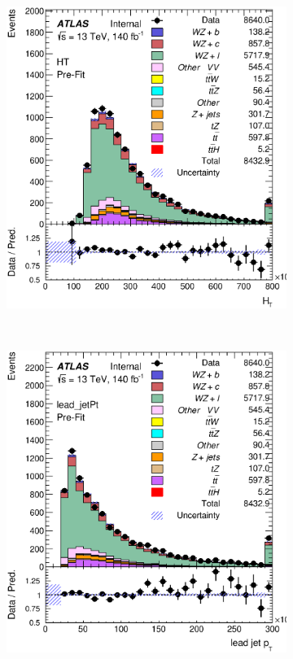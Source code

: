 \documentclass[NOTE, atlasdraft=true, texlive=2016, UKenglish]{\ATLASLATEXPATH atlasdoc}
\begin{document}
\begin{figure}[H]
\begin{subfigure}{.48\textwidth}
        \includegraphics[width=1\linewidth]{kinematics/HT.eps}
        \caption{}
        \label{fig:mll01}
    \end{subfigure}\\
    \begin{subfigure}{.48\textwidth}
        \includegraphics[width=1\linewidth]{kinematics/lead_jetPt.eps}

\end{subfigure}
\end{figure}
\end{document}
